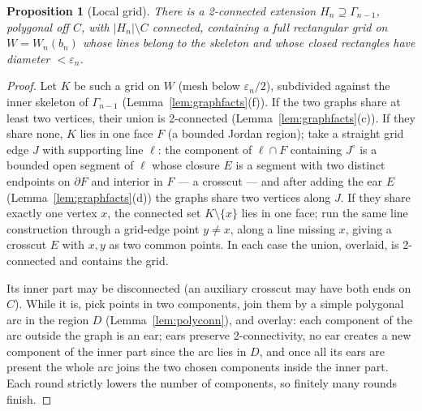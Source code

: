 \documentclass[11pt,a4paper]{article}
\theoremstyle{jsplain}
\newtheorem{proposition}[theorem]{Proposition}
\theoremstyle{jsdefn}
\begin{document}
\begin{proposition}[Local grid]\label{prop:grid}
There is a 2-connected extension $H_n\supseteq\Gamma_{n-1}$, polygonal
off $C$, with $|H_n|\setminus C$ connected, containing a full
rectangular grid on $W=W_n(b_n)$ whose lines belong to the skeleton
and whose closed rectangles have diameter $<\varepsilon_n$.
\end{proposition}
\begin{proof}
Let $K$ be such a grid on $W$ (mesh below $\varepsilon_n/2$),
subdivided against the inner skeleton of $\Gamma_{n-1}$
(Lemma~\ref{lem:graphfacts}(f)). If the two graphs share at least two
vertices, their union is 2-connected
(Lemma~\ref{lem:graphfacts}(c)). If they share none, $K$ lies in one
face $F$ (a bounded Jordan region); take a straight grid edge $J$ with
supporting line $\ell$: the component of $\ell\cap F$ containing
$J^\circ$ is a bounded open segment of $\ell$ whose closure $E$ is a
segment with two distinct endpoints on $\partial F$ and interior in
$F$ --- a crosscut --- and after adding the ear $E$
(Lemma~\ref{lem:graphfacts}(d)) the graphs share two vertices along
$J$. If they share exactly one vertex $x$, the connected set
$K\setminus\{x\}$ lies in one face; run the same line construction
through a grid-edge point $y\ne x$, along a line missing $x$, giving a
crosscut $E$ with $x,y$ as two common points. In each case the union,
overlaid, is 2-connected and contains the grid.

Its inner part may be disconnected (an auxiliary crosscut may
have both ends on $C$). While it is, pick points in two components,
join them by a simple polygonal arc in the region $D$
(Lemma~\ref{lem:polyconn}), and overlay: each component of the arc
outside the graph is an ear; ears preserve 2-connectivity, no ear
creates a new component of the inner part since the arc lies in
$D$, and once all its ears are present the whole arc joins the two
chosen components inside the inner part. Each round strictly
lowers the number of components, so finitely many rounds finish.
\end{proof}
\end{document}
